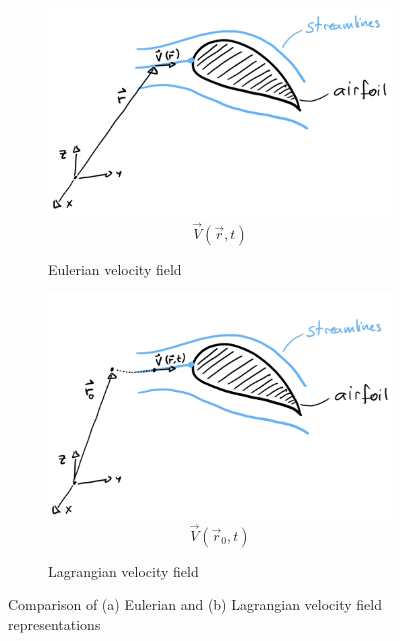 \begin{figure}[H]
	\centering
	\begin{subfigure}{0.45\textwidth}
		\centering
		\includegraphics[width=\linewidth]{Sketches/EularianVelocityField}
		\begin{equation*}
			\vec V ( \vec r,t)
		\end{equation*}
		\caption{Eulerian velocity field}
		\label{fig:eularianvelocityfield}
	\end{subfigure}%
	\hfill
	\begin{subfigure}{0.45\textwidth}
		\centering
		\includegraphics[width=\linewidth]{Sketches/LagrangianVelocityField}
		\begin{equation*}
			\vec V(\vec r_0,t)
		\end{equation*}
		\caption{Lagrangian velocity field}
		\label{fig:lagrangianvelocityfield}
	\end{subfigure}
	\caption{Comparison of (a) Eulerian and (b) Lagrangian velocity field representations}
	\label{fig:velocity_fields}
\end{figure}

